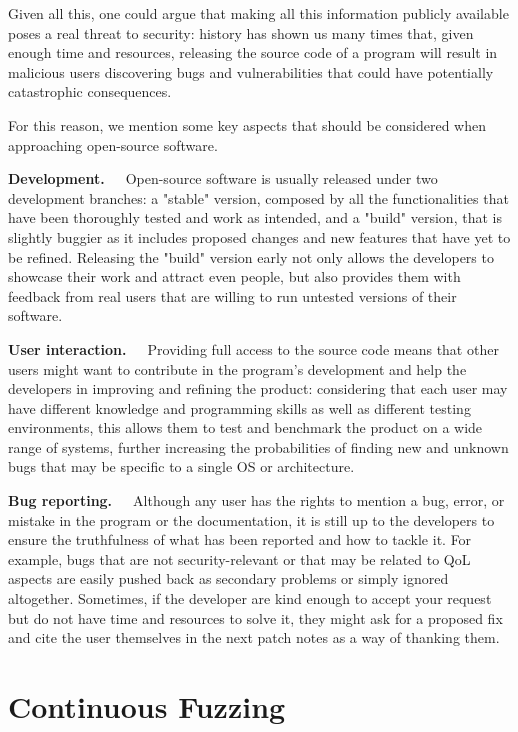 Given all this, one could argue that making all this information publicly available poses a real threat to security: history has shown us many times that, given enough time and resources, releasing the source code of a program will result in malicious users discovering bugs and vulnerabilities that could have potentially catastrophic consequences.

For this reason, we mention some key aspects that should be considered when approaching open-source software.

\textbf{Development.}\ \ \ Open-source software is usually released under two development branches: a "stable" version, composed by all the functionalities that have been thoroughly tested and work as intended, and a "build" version, that is slightly buggier as it includes proposed changes and new features that have yet to be refined. Releasing the "build" version early not only allows the developers to showcase their work and attract even people, but also provides them with feedback from real users that are willing to run untested versions of their software.

\textbf{User interaction.}\ \ \ Providing full access to the source code means that other users might want to contribute in the program's development and help the developers in improving and refining the product: considering that each user may have different knowledge and programming skills as well as different testing environments, this allows them to test and benchmark the product on a wide range of systems, further increasing the probabilities of finding new and unknown bugs that may be specific to a single OS or architecture.

\textbf{Bug reporting.}\ \ \ Although any user has the rights to mention a bug, error, or mistake in the program or the documentation, it is still up to the developers to ensure the truthfulness of what has been reported and how to tackle it. For example, bugs that are not security-relevant or that may be related to QoL aspects are easily pushed back as secondary problems or simply ignored altogether. Sometimes, if the developer are kind enough to accept your request but do not have time and resources to solve it, they might ask for a proposed fix and cite the user themselves in the next patch notes as a way of thanking them.



\newpage
\section{Continuous Fuzzing}

